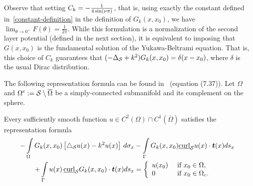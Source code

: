 Observe that setting $\C=-\frac{1}{4\sin(\nu \pi)}$, that is, using
exactly the constant defined in~\eqref{constant-definition} in the
definition of $G_k(x,x_0)$, we have $\lim_{\theta\rightarrow
0^+}F(\theta)=\frac{1}{2\pi}.$  While this formulation is a
normalization of the second layer potential (defined in the next
section), it is equivalent to imposing that $G(x,x_{0})$ is the
fundamental solution of the Yukawa-Beltrami equation.  That is, this
choice of $C_{k}$ guarantees that $(-\Delta_{\S} + k^{2})G_{k}(x,x_{0})
= \delta(x-x_{0})$, where $\delta$ is the usual Dirac distribution.



The following representation formula can be found in~\cite{mit:tay1999}
(equation (7.37)).  Let $\Omega$ and
$\Omega^{c}:=\S\setminus{\overline{\Omega}}$ be a simply-connected
submanifold and its complement on the sphere. 
\begin{proposition}
\label{prop:repr}
Every sufficiently smooth function $u \in C^{2}(\Omega) \cap
C^{1}(\overline{\Omega})$ satisfies the representation formula
\begin{align} 
\label{eq:representationformula}
 - \int\limits_{\Omega} 
    G_k(x,x_{0})\left[\lap_{\S}u(x) -k^2 u(x)\right]\,d\sigma_x 
 &- \int\limits_{{\Gamma}} G_k(x,x_{0})  
    \underline{\mbox{curl}}_{\S} u(x) \cdot \vec{t}(x) ds_x \nonumber \\
 + \int\limits_{{\Gamma}}  u(x)
 \,\underline{\mbox{curl}}_{{\S}} G_k(x,x_0) \cdot \vec{t}(x) ds_x 
 &= \left\{ \begin{array}{ll} u(x_0) & \mbox{ if $x_0\in \Omega$},\\
  0 & \mbox{ if  $x_0\in{\Omega}_c$}. 
  \end{array} \right.
\end{align}
\end{proposition}


